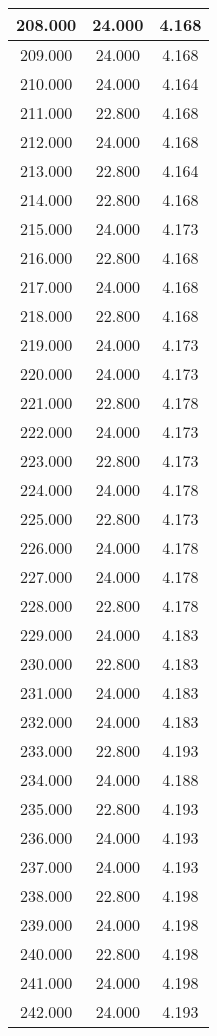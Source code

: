 \begin{longtable}[c]{|c|c|c|}
208.000	&24.000&4.168  \\ \hline 	
209.000	&24.000&4.168  \\ \hline 	
210.000	&24.000&4.164  \\ \hline 	
211.000	&22.800&4.168  \\ \hline 	
212.000	&24.000&4.168  \\ \hline 	
213.000	&22.800&4.164  \\ \hline 	
214.000	&22.800&4.168  \\ \hline 	
215.000	&24.000&4.173  \\ \hline 	
216.000	&22.800&4.168  \\ \hline 	
217.000	&24.000&4.168  \\ \hline 	
218.000	&22.800&4.168  \\ \hline 	
219.000	&24.000&4.173  \\ \hline 	
220.000	&24.000&4.173  \\ \hline 	
221.000	&22.800&4.178  \\ \hline 	
222.000	&24.000&4.173  \\ \hline 	
223.000	&22.800&4.173  \\ \hline 	
224.000	&24.000&4.178  \\ \hline 	
225.000	&22.800&4.173  \\ \hline 	
226.000	&24.000&4.178  \\ \hline 	
227.000	&24.000&4.178  \\ \hline 	
228.000	&22.800&4.178  \\ \hline 	
229.000	&24.000&4.183  \\ \hline 	
230.000	&22.800&4.183  \\ \hline 	
231.000	&24.000&4.183  \\ \hline 	
232.000	&24.000&4.183  \\ \hline 	
233.000	&22.800&4.193  \\ \hline 	
234.000	&24.000&4.188  \\ \hline 	
235.000	&22.800&4.193  \\ \hline 	
236.000	&24.000&4.193  \\ \hline 	
237.000	&24.000&4.193  \\ \hline 	
238.000	&22.800&4.198  \\ \hline 	
239.000	&24.000&4.198  \\ \hline 	
240.000	&22.800&4.198  \\ \hline 	
241.000	&24.000&4.198  \\ \hline 	
242.000	&24.000&4.193  \\ \hline 	

\end{longtable}
